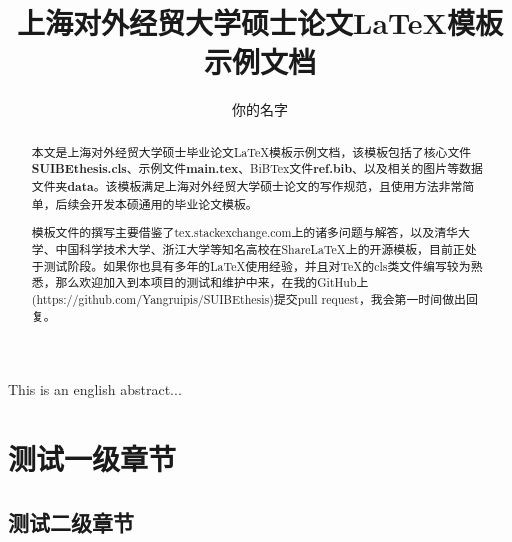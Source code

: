\documentclass{SUIBEthesis}
\begin{document}
\title{上海对外经贸大学硕士论文\LaTeX 模板示例文档}
\author{你的名字}


\maketitle

\newpage

\begin{abstract}
  本文是上海对外经贸大学硕士毕业论文\LaTeX 模板示例文档，该模板包括了核心文件\textbf{SUIBEthesis.cls}、示例文件\textbf{main.tex}、BiBTex文件\textbf{ref.bib}、以及相关的图片等数据文件夹\textbf{data}。该模板满足上海对外经贸大学硕士论文的写作规范，且使用方法非常简单，后续会开发本硕通用的毕业论文模板。

  模板文件的撰写主要借鉴了tex.stackexchange.com上的诸多问题与解答，以及清华大学、中国科学技术大学、浙江大学等知名高校在ShareLaTeX上的开源模板，目前正处于测试阶段。如果你也具有多年的\LaTeX 使用经验，并且对\TeX 的cls类文件编写较为熟悉，那么欢迎加入到本项目的测试和维护中来，在我的GitHub上(https://github.com/Yangruipis/SUIBEthesis)提交pull request，我会第一时间做出回复。

  
  
\end{abstract}


\newpage
\begin{enabstract}
  
\end{enabstract}

This is an english abstract...



\newpage
\pagestyle{empty}
\tableofcontents
\pagestyle{empty}
\thispagestyle{coverpage}


\newpage
\setcounter{page}{1}
\pagestyle{mainpage}





\section{测试一级章节}
\subsection{测试二级章节}
\end{document}
